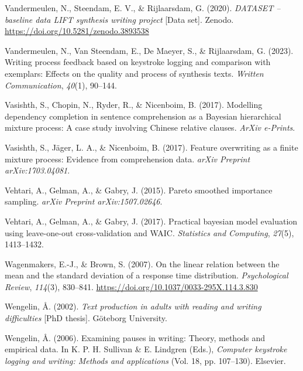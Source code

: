 \documentclass[
  man,floatsintext]{apa7}
\newlength{\cslhangindent}
\newlength{\cslentryspacingunit} %
\newenvironment{CSLReferences}[2] %
 {%
  \setlength{\parindent}{0pt}
  \ifodd #1
  \let\oldpar\par
  \def\par{\hangindent=\cslhangindent\oldpar}
  \fi
  \setlength{\parskip}{#2\cslentryspacingunit}
 }%
 {}
\begin{document}
\begin{CSLReferences}{1}{0}
\leavevmode{}%
Vandermeulen, N., Steendam, E. V., \& Rijlaarsdam, G. (2020). \emph{{DATASET} -- baseline data {LIFT} synthesis writing project} {[}Data set{]}. Zenodo. \url{https://doi.org/10.5281/zenodo.3893538}

\leavevmode{}%
Vandermeulen, N., Van Steendam, E., De Maeyer, S., \& Rijlaarsdam, G. (2023). Writing process feedback based on keystroke logging and comparison with exemplars: Effects on the quality and process of synthesis texts. \emph{Written Communication}, \emph{40}(1), 90--144.

\leavevmode{}%
Vasishth, S., Chopin, N., Ryder, R., \& Nicenboim, B. (2017). Modelling dependency completion in sentence comprehension as a {B}ayesian hierarchical mixture process: {A} case study involving {C}hinese relative clauses. \emph{ArXiv e-Prints}.

\leavevmode{}%
Vasishth, S., Jäger, L. A., \& Nicenboim, B. (2017). Feature overwriting as a finite mixture process: Evidence from comprehension data. \emph{arXiv Preprint arXiv:1703.04081}.

\leavevmode{}%
Vehtari, A., Gelman, A., \& Gabry, J. (2015). Pareto smoothed importance sampling. \emph{arXiv Preprint arXiv:1507.02646}.

\leavevmode{}%
Vehtari, A., Gelman, A., \& Gabry, J. (2017). Practical bayesian model evaluation using leave-one-out cross-validation and {WAIC}. \emph{Statistics and Computing}, \emph{27}(5), 1413--1432.

\leavevmode{}%
Wagenmakers, E.-J., \& Brown, S. (2007). On the linear relation between the mean and the standard deviation of a response time distribution. \emph{Psychological Review}, \emph{114}(3), 830--841. \url{https://doi.org/10.1037/0033-295X.114.3.830}

\leavevmode{}%
Wengelin, Å. (2002). \emph{Text production in adults with reading and writing difficulties} {[}PhD thesis{]}. Göteborg University.

\leavevmode{}%
Wengelin, Å. (2006). Examining pauses in writing: {T}heory, methods and empirical data. In K. P. H. Sullivan \& E. Lindgren (Eds.), \emph{Computer keystroke logging and writing: Methods and applications} (Vol. 18, pp. 107--130). Elsevier.


\end{CSLReferences}
\end{document}
